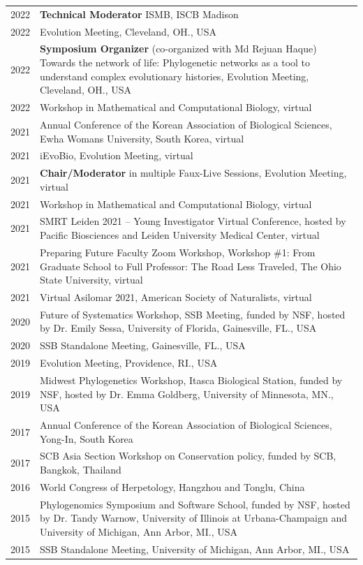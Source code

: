 \documentclass[11pt]{article}
\begin{document}
\begin{longtable}{p{}  p{}}

2022 &\textbf{Technical Moderator} ISMB, ISCB Madison\\
2022 & Evolution Meeting, Cleveland, OH., USA\\
2022 & \textbf{Symposium Organizer} (co-organized with Md Rejuan Haque) Towards the network of life: Phylogenetic networks as a tool to understand complex evolutionary histories, Evolution Meeting, Cleveland, OH., USA\\
2022 & Workshop in Mathematical and Computational Biology, virtual\\
2021 & Annual Conference of the Korean Association of Biological Sciences, Ewha Womans University, South Korea, virtual\\
2021 & iEvoBio, Evolution Meeting, virtual\\
2021 & \textbf{Chair/Moderator} in multiple Faux-Live Sessions, Evolution Meeting, virtual\\
2021 & Workshop in Mathematical and Computational Biology, virtual\\
2021 & SMRT Leiden 2021 – Young Investigator Virtual Conference, hosted by Pacific Biosciences and Leiden University Medical Center, virtual\\
2021 & Preparing Future Faculty Zoom Workshop, Workshop \#1: From Graduate School to Full Professor: The Road Less Traveled, The Ohio State University, virtual\\
2021 & Virtual Asilomar 2021, American Society of Naturalists, virtual\\
2020 & Future of Systematics Workshop, SSB Meeting, funded by NSF, hosted by Dr. Emily Sessa, University of Florida, Gainesville, FL., USA\\
2020 & SSB Standalone Meeting, Gainesville, FL., USA\\
2019 & Evolution Meeting, Providence, RI., USA\\
2019 & Midwest Phylogenetics Workshop, Itasca Biological Station, funded by NSF, hosted by Dr. Emma Goldberg, University of Minnesota, MN., USA\\
2017 & Annual Conference of the Korean Association of Biological Sciences, Yong-In, South Korea\\
2017 & SCB Asia Section Workshop on Conservation policy, funded by SCB, Bangkok, Thailand\\
2016 & World Congress of Herpetology, Hangzhou and Tonglu, China\\
2015 & Phylogenomics Symposium and Software School, funded by NSF, hosted by Dr. Tandy Warnow, University of Illinois at Urbana-Champaign and University of Michigan, Ann Arbor, MI., USA\\
2015 & SSB Standalone Meeting, University of Michigan, Ann Arbor, MI., USA\vspace{5pt}\\
\end{longtable}
\end{document}
